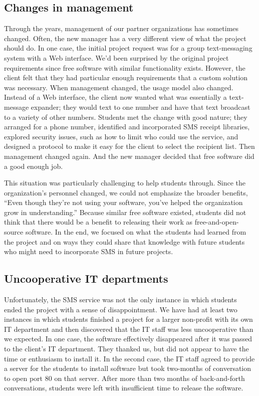 \subsection{Changes in management}

Through the years, management of our partner organizations has
sometimes changed.  Often, the new manager has a very different
view of what the project should do.  In one case, the initial project
request was for a group text-messaging system with a Web interface.
We'd been surprised by the original project requirements since
free software with similar functionality exists.  However, the
client felt that they had particular enough requirements that a custom
solution was necessary.  When management changed, the usage model
also changed.  Instead of a Web interface, the client now wanted
what was essentially a text-message expander; they would text to
one number and have that text broadcast to a variety of other
numbers.  Students met the change with good nature; they arranged
for a phone number, identified and incorporated SMS receipt libraries,
explored security issues, such as how to limit who could use the
service, and designed a protocol to make it easy for the client to
select the recipient list.  Then management changed again.  And the
new manager decided that free software did a good enough job.

This situation was particularly challenging to help students through.
Since the organization's personnel changed, we could not emphasize
the broader benefits, ``Even though they're not using your software,
you've helped the organization grow in understanding.'' Because
similar free software existed, students did not think that there
would be a benefit to releasing their work as free-and-open-source
software.  In the end, we focused on what the students had learned
from the project and on ways they could share that knowledge with
future students who might need to incorporate SMS in future projects.

\subsection{Uncooperative IT departments}

Unfortunately, the SMS service was not the only instance in which
students ended the project with a sense of disappointment.  We have
had at least two instances in which students finished a project for
a larger non-profit with its own IT department and then discovered
that the IT staff was less uncooperative than we expected.  In one
case, the software effectively disappeared after it was passed to
the client's IT department.  They thanked us, but did not appear
to have the time or enthusiasm to install it.  In the second case,
the IT staff agreed to provide a server for the students to install
software but took two-months of conversation to open port 80 on
that server.  After more than two months of back-and-forth
conversations, students were left with insufficient time to release
the software.

